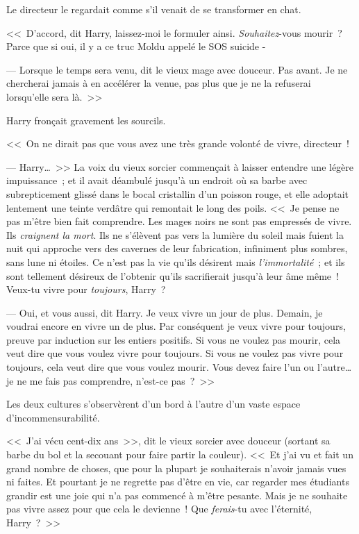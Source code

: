 Le directeur le regardait comme s'il venait de se transformer en chat.

<<~D'accord, dit Harry, laissez-moi le formuler ainsi. \emph{Souhaitez}-vous mourir~? Parce que si oui, il y a ce truc Moldu appelé le SOS suicide -

--- Lorsque le temps sera venu, dit le vieux mage avec douceur. Pas avant. Je ne chercherai jamais à en accélérer la venue, pas plus que je ne la refuserai lorsqu'elle sera là.~>>

Harry fronçait gravement les sourcils.

<<~On ne dirait pas que vous avez une très grande volonté de vivre, directeur~!

--- Harry…~>> La voix du vieux sorcier commençait à laisser entendre une légère impuissance~; et il avait déambulé jusqu'à un endroit où sa barbe avec subrepticement glissé dans le bocal cristallin d'un poisson rouge, et elle adoptait lentement une teinte verdâtre qui remontait le long des poils. <<~Je pense ne pas m'être bien fait comprendre. Les mages noirs ne sont pas empressés de vivre. Ils \emph{craignent la mort}. Ils ne s'élèvent pas vers la lumière du soleil mais fuient la nuit qui approche vers des cavernes de leur fabrication, infiniment plus sombres, sans lune ni étoiles. Ce n'est pas la vie qu'ils désirent mais \emph{l'immortalité}~; et ils sont tellement désireux de l'obtenir qu'ils sacrifierait jusqu'à leur âme même~! Veux-tu vivre pour \emph{toujours}, Harry~?

--- Oui, et vous aussi, dit Harry. Je veux vivre un jour de plus. Demain, je voudrai encore en vivre un de plus. Par conséquent je veux vivre pour toujours, preuve par induction sur les entiers positifs. Si vous ne voulez pas mourir, cela veut dire que vous voulez vivre pour toujours. Si vous ne voulez pas vivre pour toujours, cela veut dire que vous voulez mourir. Vous devez faire l'un ou l'autre… je ne me fais pas comprendre, n'est-ce pas~?~>>

Les deux cultures s'observèrent d'un bord à l'autre d'un vaste espace d'incommensurabilité.

<<~J'ai vécu cent-dix ans~>>, dit le vieux sorcier avec douceur (sortant sa barbe du bol et la secouant pour faire partir la couleur). <<~Et j'ai vu et fait un grand nombre de choses, que pour la plupart je souhaiterais n'avoir jamais vues ni faites. Et pourtant je ne regrette pas d'être en vie, car regarder mes étudiants grandir est une joie qui n'a pas commencé à m'être pesante. Mais je ne souhaite pas vivre assez pour que cela le devienne~! Que \emph{ferais}-tu avec l'éternité, Harry~?~>>

